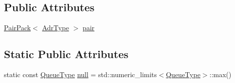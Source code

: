 \subsection*{Public Attributes}
\begin{DoxyCompactItemize}
\item 
\hyperlink{structutil_1_1PairPack}{Pair\-Pack}$<$ \hyperlink{structutil_1_1PoolQueue_3_01Adr_3_01ADR__TYPE_01_4_01_4_a38ac7f747c36631995a73845c63593b3}{Adr\-Type} $>$ \hyperlink{structutil_1_1PoolQueue_3_01Adr_3_01ADR__TYPE_01_4_01_4_abe15b5174df1c89f696e304231683c92}{pair}
\end{DoxyCompactItemize}
\subsection*{Static Public Attributes}
\begin{DoxyCompactItemize}
\item 
static const \hyperlink{structutil_1_1PoolQueue_3_01Adr_3_01ADR__TYPE_01_4_01_4_a4fcdebc8e6fe82133f13bd6eca5b3034}{Queue\-Type} \hyperlink{structutil_1_1PoolQueue_3_01Adr_3_01ADR__TYPE_01_4_01_4_a53b042698b3c546222bbd78fb47a40d3}{null} = std\-::numeric\-\_\-limits$<$\hyperlink{structutil_1_1PoolQueue_3_01Adr_3_01ADR__TYPE_01_4_01_4_a4fcdebc8e6fe82133f13bd6eca5b3034}{Queue\-Type}$>$\-::max()
\end{DoxyCompactItemize}


